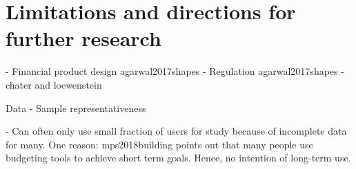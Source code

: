 
\section{Limitations and directions for further research}%
\label{sec:limitations}



- Financial product design agarwal2017shapes
- Regulation agarwal2017shapes
- chater and loewenstein






Data
- Sample representativeness

- Can often only use small fraction of users for study because of incomplete
data for many. One reason: mps2018building points out that many people use
budgeting tools to achieve short term goals. Hence, no intention of long-term
use.



